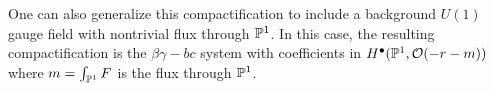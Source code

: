 \documentclass[11pt]{amsart}
\begin{document}
One can also generalize this compactification to include a background $U(1)$ gauge field with nontrivial flux through $\mathbb P^1$.
In this case, the resulting compactification is the $\beta\gamma-bc$ system with coefficients in $H^\bullet(\mathbb P^1, \mathcal O(-r-m))$ where $m = \int_{\mathbb P^1} F$ is the flux through $\mathbb P^1$.
\end{document}
